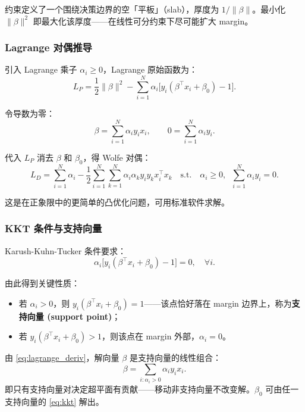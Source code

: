 约束定义了一个围绕决策边界的空「平板」（slab），厚度为 $1/\|\beta\|$。最小化 $\|\beta\|^2$ 即最大化该厚度——在线性可分约束下尽可能扩大 margin。

\subsubsection{Lagrange 对偶推导}

引入 Lagrange 乘子 $\alpha_i \geq 0$，Lagrange 原始函数为：
\begin{equation}\label{eq:lagrange_primal}
    L_P = \frac12 \|\beta\|^2 - \sum_{i=1}^{N} \alpha_i \big[ y_i(\beta^\top x_i + \beta_0) - 1 \big].
\end{equation}

令导数为零：
\begin{equation}\label{eq:lagrange_deriv}
    \beta = \sum_{i=1}^{N} \alpha_i y_i x_i, \qquad
    0 = \sum_{i=1}^{N} \alpha_i y_i.
\end{equation}

代入 $L_P$ 消去 $\beta$ 和 $\beta_0$，得 Wolfe 对偶：
\begin{equation}\label{eq:wolfe_dual}
    L_D = \sum_{i=1}^{N} \alpha_i - \frac12 \sum_{i=1}^{N} \sum_{k=1}^{N} \alpha_i \alpha_k y_i y_k x_i^\top x_k
    \quad \text{s.t.} \quad \alpha_i \geq 0, \;\; \sum_{i=1}^{N} \alpha_i y_i = 0.
\end{equation}

这是在正象限中的更简单的凸优化问题，可用标准软件求解。

\subsubsection{KKT 条件与支持向量}

Karush-Kuhn-Tucker 条件要求：
\begin{equation}\label{eq:kkt}
    \alpha_i \big[ y_i(\beta^\top x_i + \beta_0) - 1 \big] = 0, \quad \forall i.
\end{equation}

由此得到关键性质：
\begin{itemize}
    \item 若 $\alpha_i > 0$，则 $y_i(\beta^\top x_i + \beta_0) = 1$——该点恰好落在 margin 边界上，称为\textbf{支持向量 (support point)}；
    \item 若 $y_i(\beta^\top x_i + \beta_0) > 1$，则该点在 margin 外部，$\alpha_i = 0$。
\end{itemize}

由 \eqref{eq:lagrange_deriv}，解向量 $\beta$ 是支持向量的线性组合：
\[
\beta = \sum_{i: \alpha_i > 0} \alpha_i y_i x_i.
\]
即只有支持向量对决定超平面有贡献——移动非支持向量不改变解。$\beta_0$ 可由任一支持向量的 \eqref{eq:kkt} 解出。

